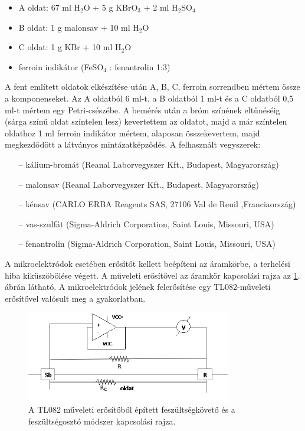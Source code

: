 \begin{itemize} \label{komponensek}
\item A oldat: 67 ml H$_2$O + 5 g KBrO$_3$ + 2 ml H$_2$SO$_4$
\item B oldat: 1 g malonsav + 10 ml H$_2$O
\item C oldat: 1 g KBr + 10 ml H$_2$O
\item ferroin indikátor (FeSO$_4$ : fenantrolin 1:3)
\end{itemize}
A fent említett oldatok elkészítése után A, B, C, ferroin sorrendben mértem össze a komponenseket. Az A oldatból 6 ml-t, a B oldatból 1 ml-t és a C oldatból 0,5 ml-t mértem egy Petri-csészébe. A bemérés után a bróm színének eltűnéséig (sárga színű oldat színtelen lesz) kevertettem az oldatot, majd a már színtelen oldathoz 1 ml ferroin indikátor mértem, alaposan összekevertem, majd megkezdődött a látványos mintázatképződés. 
A felhasznált vegyszerek:
\begin{itemize}
\item[--]kálium-bromát (Reanal Laborvegyszer Kft., Budapest, Magyarország)
\item[--]malonsav (Reanal Laborvegyszer Kft., Budapest, Magyarország)
\item[--]kénsav (CARLO ERBA Reagents SAS, 27106 Val de Reuil ,Franciaország)
\item[--]vas-szulfát (Sigma-Aldrich Corporation, Saint Louis, Missouri, USA)
\item[--]fenantrolin (Sigma-Aldrich Corporation, Saint Louis, Missouri, USA)
\end{itemize}
A mikroelektródok esetében erősítőt kellett beépíteni az áramkörbe, a terhelési hiba kiküszöbölése végett. A műveleti erősítővel az áramkör kapcsolási rajza az \ref{fig:erosito}. ábrán látható. A mikroelektródok jelének felerősítése egy TL082-műveleti erősítővel valósult meg a gyakorlatban.
\begin{figure}[h!]
\centering
\includegraphics[width=0.8\textwidth]{img/erosito2.png}
\caption{A TL082 műveleti erősítőből épített feszültségkövető és a feszültségosztó módszer kapcsolási rajza.}
\label{fig:erosito}
\end{figure}
